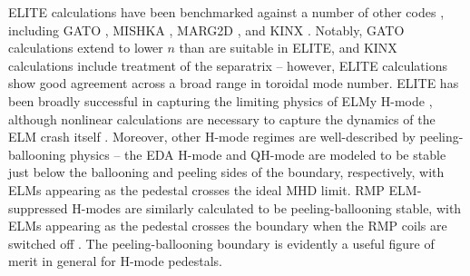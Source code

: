 \begin{figure}
 \pushtooutside
\end{figure}

ELITE calculations have been benchmarked against a number of other codes \cite{Snyder2009a}, including GATO \cite{Bernard1981}, MISHKA \cite{Mikhailovskii1997,Huysmans2001}, MARG2D \cite{Aiba2006,Aiba2007}, and KINX \cite{Degtyarev1997,Medvedev2006}.  Notably, GATO calculations extend to lower $n$ than are suitable in ELITE, and KINX calculations include treatment of the separatrix -- however, ELITE calculations show good agreement across a broad range in toroidal mode number.  ELITE has been broadly successful in capturing the limiting physics of ELMy H-mode \cite{Snyder2004}, although nonlinear calculations are necessary to capture the dynamics of the ELM crash itself \cite{Snyder2005}.  Moreover, other H-mode regimes are well-described by peeling-ballooning physics -- the EDA H-mode \cite{Mossessian2002,Mossessian2003} and QH-mode \cite{Snyder2007} are modeled to be stable just below the ballooning and peeling sides of the boundary, respectively, with ELMs appearing as the pedestal crosses the ideal MHD limit.  RMP ELM-suppressed H-modes are similarly calculated to be peeling-ballooning stable, with ELMs appearing as the pedestal crosses the boundary when the RMP coils are switched off \cite{Snyder2009}.  The peeling-ballooning boundary is evidently a useful figure of merit in general for H-mode pedestals.\nicesectionending

